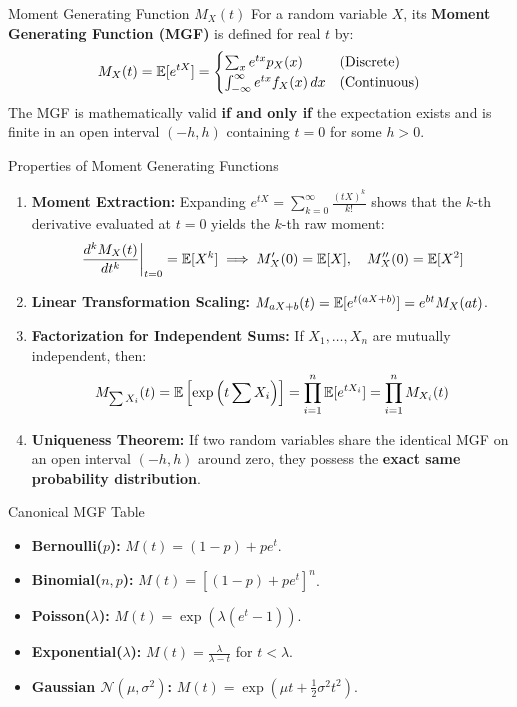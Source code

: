 \begin{definitionbox}{Moment Generating Function $M_X(t)$}
For a random variable $X$, its \textbf{Moment Generating Function (MGF)} is defined for real $t$ by:
$$M_X(t) = \mathbb{E}[e^{tX}] = \begin{cases} \sum_x e^{tx} p_X(x) & \text{(Discrete)} \\ \int_{-\infty}^{\infty} e^{tx} f_X(x) \, dx & \text{(Continuous)} \end{cases}$$
The MGF is mathematically valid \textbf{if and only if} the expectation exists and is finite in an open interval $(-h, h)$ containing $t = 0$ for some $h > 0$.
\end{definitionbox}

\begin{theorembox}{Properties of Moment Generating Functions}
\begin{enumerate}
    \item \textbf{Moment Extraction:} Expanding $e^{tX} = \sum_{k=0}^\infty \frac{(tX)^k}{k!}$ shows that the $k$-th derivative evaluated at $t = 0$ yields the $k$-th raw moment:
    $$\left. \frac{d^k M_X(t)}{dt^k} \right|_{t=0} = \mathbb{E}[X^k] \implies M_X'(0) = \mathbb{E}[X], \quad M_X''(0) = \mathbb{E}[X^2]$$
    \item \textbf{Linear Transformation Scaling:} $M_{aX + b}(t) = \mathbb{E}[e^{t(aX + b)}] = e^{bt} M_X(at)$.
    \item \textbf{Factorization for Independent Sums:} If $X_1, \dots, X_n$ are mutually independent, then:
    $$M_{\sum X_i}(t) = \mathbb{E}\left[ \exp\left(t \sum X_i\right) \right] = \prod_{i=1}^n \mathbb{E}[e^{tX_i}] = \prod_{i=1}^n M_{X_i}(t)$$
    \item \textbf{Uniqueness Theorem:} If two random variables share the identical MGF on an open interval $(-h, h)$ around zero, they possess the \textbf{exact same probability distribution}.
\end{enumerate}
\end{theorembox}

\begin{formulabox}{Canonical MGF Table}
\begin{itemize}
    \item \textbf{Bernoulli($p$):} $M(t) = (1 - p) + p e^t$.
    \item \textbf{Binomial($n, p$):} $M(t) = \left[(1 - p) + p e^t\right]^n$.
    \item \textbf{Poisson($\lambda$):} $M(t) = \exp(\lambda(e^t - 1))$.
    \item \textbf{Exponential($\lambda$):} $M(t) = \frac{\lambda}{\lambda - t}$ for $t < \lambda$.
    \item \textbf{Gaussian $\mathcal{N}(\mu, \sigma^2)$:} $M(t) = \exp\left(\mu t + \frac{1}{2}\sigma^2 t^2\right)$.
\end{itemize}
\end{formulabox}

